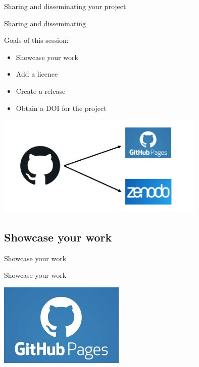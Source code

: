 \begin{frame}%

\huge{Sharing and disseminating your project}

\end{frame}

\begin{frame}{Sharing and disseminating}

Goals of this session:

\begin{itemize}
    \item Showcase your work
    \item Add a licence
    \item Create a release
    \item Obtain a DOI for the project
\end{itemize}

\includegraphics[width=10cm]{08_sharing/images/from_github.png}

\end{frame}

\subsection{Showcase your work}

\begin{frame}{}

\huge{Showcase your work}

\end{frame}

\begin{frame}{Showcase your work}

\centering\includegraphics[width=6cm]{08_sharing/images/github_pages.png}

\end{frame}

